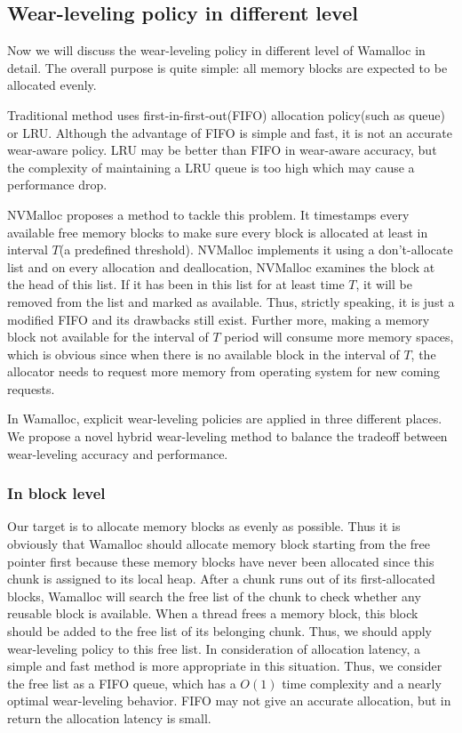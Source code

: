 \documentclass[10pt, conference, compsocconf]{IEEEtran}
\begin{document}
\subsection{Wear-leveling policy in different level}

Now we will discuss the wear-leveling policy in different level of Wamalloc in detail.
The overall purpose is quite simple: all memory blocks are expected to be allocated evenly.

Traditional method uses first-in-first-out(FIFO) allocation policy(such as queue) 
or LRU\cite{zhou2009durable}\cite{rodriguez2015write}.
Although the advantage of FIFO is simple and fast, it is not an accurate wear-aware policy.
LRU may be better than FIFO in wear-aware accuracy, but the complexity of maintaining a LRU queue is too high which may cause a performance drop.

NVMalloc\cite{moraru2013consistent} proposes a method to tackle this problem.
It timestamps every available free memory blocks to make sure every block is allocated at least in interval $T$(a predefined threshold).
NVMalloc implements it using a don't-allocate list and on every allocation and deallocation,
NVMalloc examines the block at the head of this list.
If it has been in this list for at least time $T$,
it will be removed from the list and marked as available.
Thus, strictly speaking, it is just a modified FIFO and its drawbacks still exist.
Further more, making a memory block not available for the interval of $T$ period will consume more memory spaces,
which is obvious since when there is no available block in the interval of $T$, 
the allocator needs to request more memory from operating system for new coming requests.

In Wamalloc, explicit wear-leveling policies are applied in three different places. 
We propose a novel hybrid wear-leveling method to balance the tradeoff between wear-leveling accuracy and performance.

\subsubsection{In block level}
Our target is to allocate memory blocks as evenly as possible.
Thus it is obviously that Wamalloc should allocate memory block starting from the free pointer first
because these memory blocks have never been allocated since this chunk is assigned to its local heap.
After a chunk runs out of its first-allocated blocks, 
Wamalloc will search the free list of the chunk to check whether any reusable block is available.
When a thread frees a memory block, this block should be added to the free list of its belonging chunk.
Thus, we should apply wear-leveling policy to this free list.
In consideration of allocation latency, a simple and fast method is more appropriate in this situation.
Thus, we consider the free list as a FIFO queue,
which has a $O(1)$ time complexity and a nearly optimal wear-leveling behavior.
FIFO may not give an accurate allocation, but in return the allocation latency is small.
\end{document}
